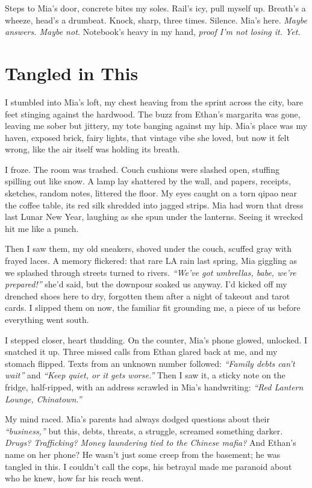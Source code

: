 \documentclass[12pt]{article} %
\begin{document}
Steps to \textnormal{Mia}’s door, concrete bites my soles. Rail’s icy, pull myself up. Breath’s a wheeze, head’s a drumbeat. Knock, sharp, three times. Silence. \textnormal{Mia}’s here. \textit{Maybe answers. Maybe not.} Notebook’s heavy in my hand, \textit{proof I’m not losing it. Yet.}

\section{Tangled in This}

I stumbled into \textnormal{Mia}’s loft, my chest heaving from the sprint across the city, bare feet stinging against the hardwood. The buzz from \textnormal{Ethan}’s margarita was gone, leaving me sober but jittery, my tote banging against my hip. \textnormal{Mia}’s place was my haven, exposed brick, fairy lights, that vintage vibe she loved, but now it felt wrong, like the air itself was holding its breath.

I froze. The room was trashed. Couch cushions were slashed open, stuffing spilling out like snow. A lamp lay shattered by the wall, and papers, receipts, sketches, random notes, littered the floor. My eyes caught on a torn qipao near the coffee table, its red silk shredded into jagged strips. \textnormal{Mia} had worn that dress last Lunar New Year, laughing as she spun under the lanterns. Seeing it wrecked hit me like a punch.

Then I saw them, my old sneakers, shoved under the couch, scuffed gray with frayed laces. A memory flickered: that rare LA rain last spring, \textnormal{Mia} giggling as we splashed through streets turned to rivers. \textit{“We’ve got umbrellas, babe, we’re prepared!”} she’d said, but the downpour soaked us anyway. I’d kicked off my drenched shoes here to dry, forgotten them after a night of takeout and tarot cards. I slipped them on now, the familiar fit grounding me, a piece of us before everything went south.

I stepped closer, heart thudding. On the counter, \textnormal{Mia}’s phone glowed, unlocked. I snatched it up. Three missed calls from \textnormal{Ethan} glared back at me, and my stomach flipped. Texts from an unknown number followed: \textit{“Family debts can’t wait”} and \textit{“Keep quiet, or it gets worse.”} Then I saw it, a sticky note on the fridge, half-ripped, with an address scrawled in \textnormal{Mia}’s handwriting: \textit{“Red Lantern Lounge, Chinatown.”}

My mind raced. \textnormal{Mia}’s parents had always dodged questions about their \textit{“business,”} but this, debts, threats, a struggle, screamed something darker. \textit{Drugs? Trafficking? Money laundering tied to the Chinese mafia?} And \textnormal{Ethan}’s name on her phone? He wasn’t just some creep from the basement; he was tangled in this. I couldn’t call the cops, his betrayal made me paranoid about who he knew, how far his reach went.
\end{document}
